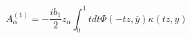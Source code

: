 \begin{equation}
A_\alpha^{(1)}=-\frac{ib_1}{2}z_\alpha\int_0^1 t dt 
\Phi(-tz,\bar{y})\kappa(tz,y)
\end{equation}


